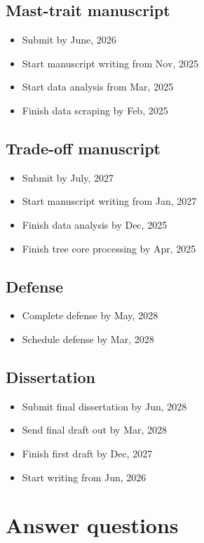 \documentclass[11pt,letter]{article}
\begin{document}
\subsection{Mast-trait manuscript} %
 \begin{itemize}
	\item Submit by June, 2026
	\item Start manuscript writing from Nov, 2025
	\item Start data analysis from Mar, 2025
	\item Finish data scraping by Feb, 2025
	\end{itemize}
\subsection{Trade-off manuscript}
 \begin{itemize}
	\item Submit by July, 2027
	\item Start manuscript writing from Jan, 2027
	\item Finish data analysis by Dec, 2025
	\item Finish tree core processing by Apr, 2025
	\end{itemize}
\subsection{Defense}	
\begin{itemize}
	\item Complete defense by May, 2028
	\item Schedule defense by Mar, 2028
	\end{itemize}
\subsection{Dissertation}	
\begin{itemize}
	\item Submit final dissertation by Jun, 2028
	\item Send final draft out by Mar, 2028
	\item Finish first draft by Dec, 2027
	\item Start writing from Jun, 2026
	\end{itemize}
\section{Answer questions}
\end{document}
